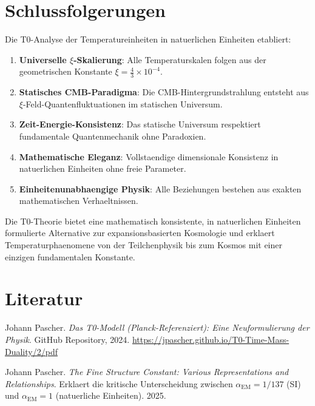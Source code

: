 \documentclass[12pt,a4paper]{article}
\begin{document}
	\section{Schlussfolgerungen}
	
	Die T0-Analyse der Temperatureinheiten in natuerlichen Einheiten etabliert:
	
	\begin{enumerate}
		\item \textbf{Universelle $\xi$-Skalierung}: Alle Temperaturskalen folgen aus der geometrischen Konstante $\xi = \frac{4}{3} \times 10^{-4}$.
		
		\item \textbf{Statisches CMB-Paradigma}: Die CMB-Hintergrundstrahlung entsteht aus $\xi$-Feld-Quantenfluktuationen im statischen Universum.
		
		\item \textbf{Zeit-Energie-Konsistenz}: Das statische Universum respektiert fundamentale Quantenmechanik ohne Paradoxien.
		
		\item \textbf{Mathematische Eleganz}: Vollstaendige dimensionale Konsistenz in natuerlichen Einheiten ohne freie Parameter.
		
		\item \textbf{Einheitenunabhaengige Physik}: Alle Beziehungen bestehen aus exakten mathematischen Verhaeltnissen.
	\end{enumerate}
	
	\begin{revolutionary}
		Die T0-Theorie bietet eine mathematisch konsistente, in natuerlichen Einheiten formulierte Alternative zur expansionsbasierten Kosmologie und erklaert Temperaturphaenomene von der Teilchenphysik bis zum Kosmos mit einer einzigen fundamentalen Konstante.
	\end{revolutionary}
	
	\section{Literatur}
	
	\begin{thebibliography}{2}
		Johann Pascher.
		\textit{Das T0-Modell (Planck-Referenziert): Eine Neuformulierung der Physik}.
		GitHub Repository, 2024.
		\url{https://jpascher.github.io/T0-Time-Mass-Duality/2/pdf}
		
		Johann Pascher.
		\textit{The Fine Structure Constant: Various Representations and Relationships}.
		Erklaert die kritische Unterscheidung zwischen $\alpha_{\text{EM}} = 1/137$ (SI) und $\alpha_{\text{EM}} = 1$ (natuerliche Einheiten).
		2025.
	\end{thebibliography}
	
\end{document}
